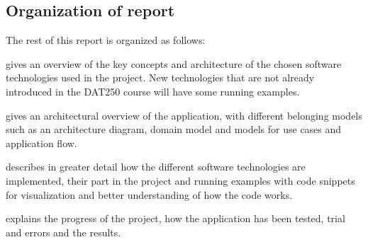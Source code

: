 \subsection{Organization of report}
\label{sub:organization}

The rest of this report is organized as follows:
\begin{description}[noitemsep]
    \item[Section~\ref{sec:technology}] gives an overview of the key concepts and architecture of the chosen software technologies used in the project. New technologies that are not already introduced in the DAT250 course will have some running examples.
    \item[Section~\ref{sec:design}] gives an architectural overview of the application, with different belonging models such as an architecture diagram, domain model and models for use cases and application flow.
    \item[Section~\ref{sec:implementation}] describes in greater detail how the different software technologies are implemented, their part in the project and running examples with code snippets for visualization and better understanding of how the code works.
    \item[Section~\ref{sec:evaluation}] explains the progress of the project, how the application has been tested, trial and errors and the results.
\end{description}
